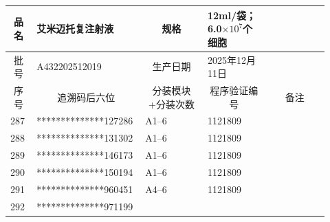 \documentclass[UTF8,10pt,a4paper,fontset=fandol]{ctexart}
\newcommand{\fieldvalue}[1]{#1}
\begin{document}
\small
\begin{tabular}{|p{0.08\linewidth}|p{0.28\linewidth}|p{0.19\linewidth}|p{0.19\linewidth}|p{0.18\linewidth}|}
\hline
\multicolumn{1}{|c|}{品名} &
\fieldvalue{艾米迈托复注射液} &
\multicolumn{1}{c|}{规格} &
\fieldvalue{12ml/袋；6.0$\times 10^{7}$个细胞} &
\\ \hline
\multicolumn{1}{|c|}{批号} &
\fieldvalue{A432202512019} &
\multicolumn{1}{c|}{生产日期} &
\fieldvalue{2025年12月11日} &
\\ \hline
\multicolumn{1}{|c|}{序号} & \multicolumn{1}{c|}{追溯码后六位} &
\multicolumn{1}{c|}{分装模块+分装次数} &
\multicolumn{1}{c|}{程序验证编号} &
\multicolumn{1}{c|}{备注} \\ \hline
287 &
\fieldvalue{**************127286} &
\fieldvalue{A1--6} &
\fieldvalue{1121809} & \\ \hline
288 &
\fieldvalue{**************131302} &
\fieldvalue{A1--6} &
\fieldvalue{1121809} & \\ \hline
289 &
\fieldvalue{**************146173} &
\fieldvalue{A1--6} &
\fieldvalue{1121809} & \\ \hline
290 &
\fieldvalue{**************150194} &
\fieldvalue{A1--6} &
\fieldvalue{1121809} & \\ \hline
291 &
\fieldvalue{**************960451} &
\fieldvalue{A4--6} &
\fieldvalue{1121809} & \\ \hline
292 &
\fieldvalue{**************971199} &

\end{tabular}
\end{document}
